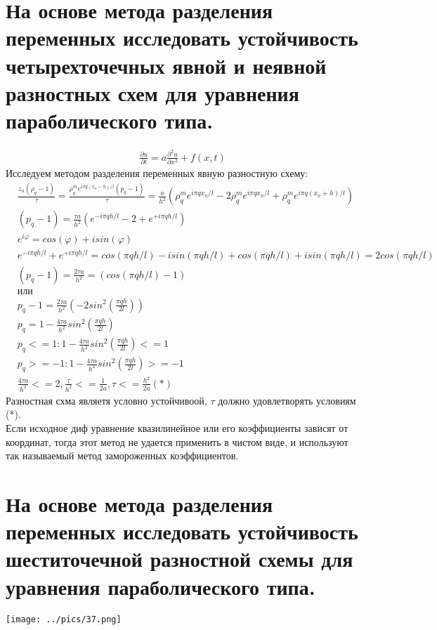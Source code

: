 \documentclass[12pt,a4paper]{article}
\begin{document}
	\section{На основе метода разделения переменных исследовать устойчивость четырехточечных явной и неявной разностных схем для уравнения параболического типа.}	
	\begin{align*}
	\frac{\partial u }{\partial t}  = a \frac{\partial^2 u}{\partial x^2} + f(x,t)
	\end{align*}
	Исследуем методом разделения переменных явную разностную схему:
	\begin{align*}
	&\frac{z_n(\rho_q -1 )}{\tau} = \frac{\rho^m_q e^{i \pi q (x_n - h) / l} (p_q -1)}{\tau} = \frac{a}{h^2} ( \rho^m_q e^{i \pi q x_n / l} - 2 \rho^m_q e^{i \pi q x_n / l} + \rho^m_q e^{i \pi q (x_n + h) / l})\\
	&(p_q - 1) = \frac{\tau a }{h^2} (e^{-i \pi q h / l} - 2 + e^{+i \pi q h / l})\\
	&e^{i \varphi } = cos(\varphi) + i sin(\varphi)\\
	&e^{-i \pi q h / l}  + e^{+i \pi q h / l}	= cos(\pi q h / l) - i sin(\pi q h / l) + cos(\pi q h / l) + i sin(\pi q h / l) = 2 cos(\pi q h / l)\\
	&(p_q - 1) = \frac{2\tau a}{h^2} = (cos(\pi q h / l) - 1)\\
	&\text{или}\\
	&p_q-1 = \frac{2\tau a}{h^2} (-2 sin^2(\frac{\pi q h}{2l}))\\
	&p_q = 1 - \frac{4\tau a}{h^2} sin^2(\frac{\pi q h}{2l}) \\
	&p_q <= 1 : 1 - \frac{4\tau a}{h^2} sin^2(\frac{\pi q h}{2l}) <= 1\\
	&p_q >= - 1 : 1 - \frac{4\tau a}{h^2} sin^2(\frac{\pi q h}{2l}) >= -1\\
	&\frac{4\tau a}{h^2} <= 2, \frac{\tau}{h^2} <= \frac{1}{2a}, \tau <= \frac{h^2}{2a}	 (*)
	\end{align*}
	Разностная схма являетя условно устойчивоой, $\tau$ должно удовлетворять условиям (*). \\
	Если исходное диф уравнение квазилинейное или его коэффициенты зависят от координат, тогда этот метод не удается применить в чистом виде, и используют так называемый метод замороженных коэффициентов. 
	
	\section{На основе метода разделения переменных исследовать устойчивость шеститочечной разностной схемы для уравнения параболического типа.}	
	\texttt{[image: ../pics/37.png]}\\
\end{document}
